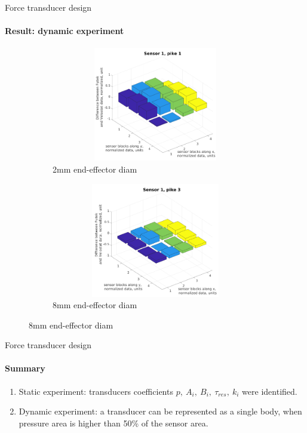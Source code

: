 \documentclass[aspectratio=169,xcolor=table]{beamer}
\begin{document}
\begin{frame}[t]{Force transducer design}
    \framesubtitle{Result: dynamic experiment}
    \vspace{-15pt}
    \begin{figure}[H]
        \begin{subfigure}{0.49\textwidth}
            \centering\includegraphics[height=5cm,width=1\textwidth,keepaspectratio]{sens1_pike1.png}
            \caption*{2mm end-effector diam}
            \label{fig:sens1_pike1}
        \end{subfigure}
        \begin{subfigure}{0.49\textwidth}
            \centering\includegraphics[height=5cm,width=1\textwidth,keepaspectratio]{sens1_pike3.png}
            \caption*{8mm end-effector diam}
            \label{fig:sens1_pike3}
        \end{subfigure}
    \end{figure}
\end{frame}

\begin{frame}[t]{Force transducer design}
    \framesubtitle{Summary}
    \vspace{-15pt}
    {\large
        \begin{enumerate}
            \item Static experiment: transducers coefficients $p,\ A_i,\ B_i,\ \tau_{res},\ k_i$ were identified.
            \item Dynamic experiment: a transducer can be represented as a single body, when pressure area is higher than 50\% of the sensor area.
        \end{enumerate}
    }
\end{frame}
\end{document}
